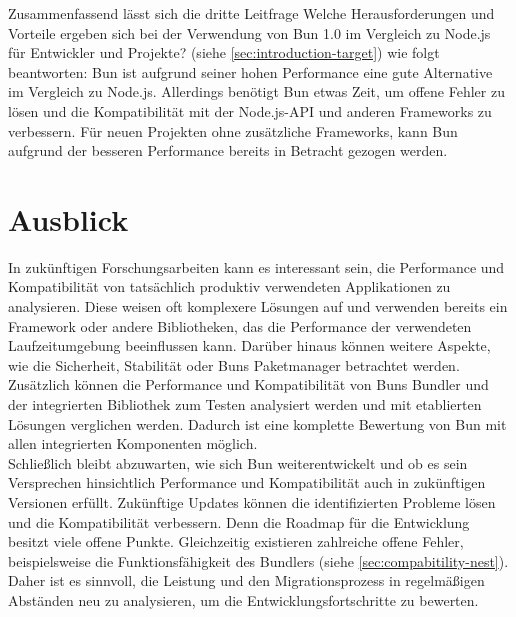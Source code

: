 \noindent
Zusammenfassend lässt sich die dritte Leitfrage \glqq Welche Herausforderungen und Vorteile ergeben sich bei der Verwendung von Bun 1.0 im Vergleich zu Node.js für Entwickler und Projekte?\grqq{} (siehe \autoref{sec:introduction-target}) wie folgt beantworten: Bun ist aufgrund seiner hohen Performance eine gute Alternative im Vergleich zu Node.js. Allerdings benötigt Bun etwas Zeit, um offene Fehler zu lösen und die Kompatibilität mit der Node.js-API und anderen Frameworks zu verbessern. Für neuen Projekten ohne zusätzliche Frameworks, kann Bun aufgrund der besseren Performance bereits in Betracht gezogen werden.


\section{Ausblick} \label{sec:finalThoughts-outlook}
In zukünftigen Forschungsarbeiten kann es interessant sein, die Performance und Kompatibilität von tatsächlich produktiv verwendeten Applikationen zu analysieren. Diese weisen oft komplexere Lösungen auf und verwenden bereits ein Framework oder andere Bibliotheken, das die Performance der verwendeten Laufzeitumgebung beeinflussen kann. Darüber hinaus können weitere Aspekte, wie die Sicherheit, Stabilität oder Buns Paketmanager betrachtet werden. Zusätzlich können die Performance und Kompatibilität von Buns Bundler und der integrierten Bibliothek zum Testen analysiert werden und mit etablierten Lösungen verglichen werden. Dadurch ist eine komplette Bewertung von Bun mit allen integrierten Komponenten möglich.\\

\noindent
Schließlich bleibt abzuwarten, wie sich Bun weiterentwickelt und ob es sein Versprechen hinsichtlich Performance und Kompatibilität auch in zukünftigen Versionen erfüllt. Zukünftige Updates können die identifizierten Probleme lösen und die Kompatibilität verbessern. Denn die Roadmap für die Entwicklung besitzt viele offene Punkte. Gleichzeitig existieren zahlreiche offene Fehler, beispielsweise die Funktionsfähigkeit des Bundlers (siehe \autoref{sec:compabitility-nest}). Daher ist es sinnvoll, die Leistung und den Migrationsprozess in regelmäßigen Abständen neu zu analysieren, um die Entwicklungsfortschritte zu bewerten.
